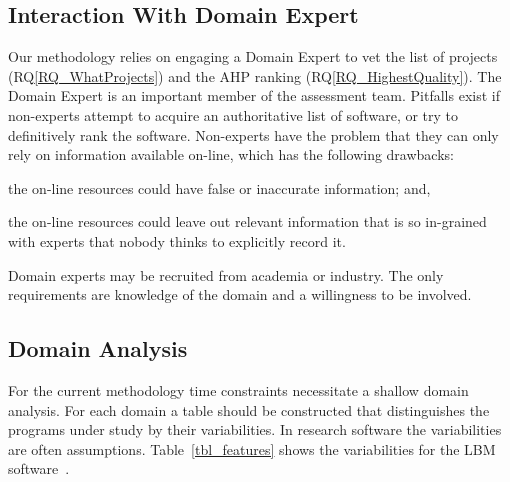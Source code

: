 \documentclass[runningheads]{llncs}
\newcommand{\rqref}[1]{RQ\ref{#1}}
\begin{document}
\subsection{Interaction With Domain Expert} \label{sec_vet_software_list}

Our methodology relies on engaging a Domain Expert to vet the list of projects
(\rqref{RQ_WhatProjects}) and the AHP ranking (\rqref{RQ_HighestQuality}).  The
Domain Expert is an important member of the assessment
team. Pitfalls exist if non-experts attempt to acquire an authoritative list of
software, or try to definitively rank the software. Non-experts have the problem
that they can only rely on information available on-line, which has the
following drawbacks:
\begin{inparaenum}[i)]
  \item the on-line resources could have false or inaccurate information; and,
  \item the on-line resources could leave out relevant information that is so
in-grained with experts that nobody thinks to explicitly record it.
\end{inparaenum}
Domain experts may be recruited from academia or industry.  The only
requirements are knowledge of the domain and a willingness to be involved.

\subsection{Domain Analysis} \label{SecDomainAnalysis}

For the current methodology time constraints necessitate a shallow domain
analysis. For each domain a table should be constructed that distinguishes the
programs under study by their variabilities.  In research software the
variabilities are often assumptions. Table~\ref{tbl_features} shows the
variabilities for the LBM software~\cite{Michalski2021}.
\end{document}
